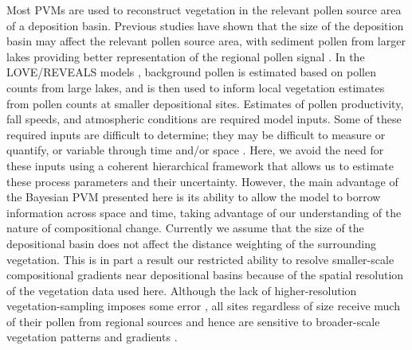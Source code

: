\documentclass[12pt]{article}
\begin{document}
Most PVMs are used to reconstruct vegetation in the relevant pollen
source area of a deposition basin. Previous studies have shown that
the size of the deposition basin may affect the relevant pollen source
area, with sediment pollen from larger lakes providing better
representation of the regional pollen signal \citep{sugita2007theory1,
  sugita1994pollen, jacobson1981selection}. In the LOVE/REVEALS models
\citep{sugita2007theory1, sugita2007theory2}, background pollen is
estimated based on pollen counts from large lakes, and is then used to
inform local vegetation estimates from pollen counts at smaller
depositional sites. Estimates of pollen productivity, fall speeds, and
atmospheric conditions are required model inputs. Some of these
required inputs are difficult to determine; they may be difficult to
measure or quantify, or variable through time and/or space
\citep{jackson1999pollen}. Here, we avoid the need for these inputs
using a coherent hierarchical framework that allows us to estimate
these process parameters and their uncertainty. However, the main
advantage of the Bayesian PVM presented here is its ability to allow
the model to borrow information across space and time, taking
advantage of our understanding of the nature of compositional
change. Currently we assume that the size of the depositional basin
does not affect the distance weighting of the surrounding
vegetation. This is in part a result our restricted ability to resolve
smaller-scale compositional gradients near depositional basins because
of the spatial resolution of the vegetation data used here. Although
the lack of higher-resolution vegetation-sampling imposes some error
\citep{bradshaw1985relationships, prentice1987quantitative,
  jackson1990}, all sites regardless of size receive much of their
pollen from regional sources and hence are sensitive to broader-scale
vegetation patterns and gradients \citep{bradshaw1985relationships,
  prentice1987quantitative, jackson1991pollen, sugita2007theory1,
  sugita2007theory2}.




\end{document}
